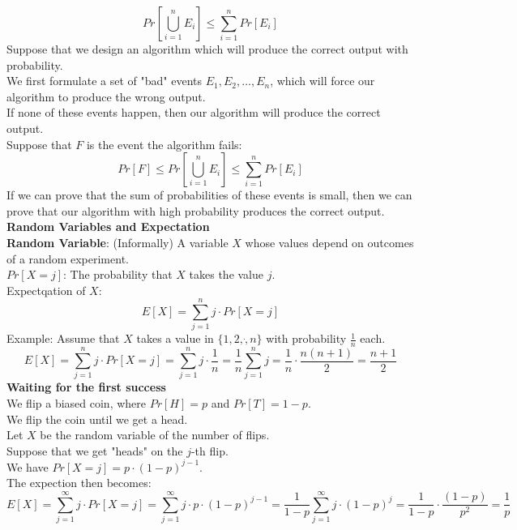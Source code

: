 \documentclass[onecolumn]{report}
\begin{document}
\begin{equation*}
    Pr[\bigcup^n_{i=1} E_i] \leq \sum^n_{i=1} Pr[E_i]
\end{equation*}
Suppose that we design an algorithm which will produce the correct output with probability.\\
We first formulate a set of "bad" events $E_1, E_2, \dots, E_n$, which will force our algorithm to produce the wrong output.\\
If none of these events happen, then our algorithm will produce the correct output.\\
Suppose that $F$ is the event the algorithm fails:
\begin{equation*}
    Pr[F] \leq Pr[\bigcup^n_{i=1} E_i] \leq \sum^n_{i=1} Pr[E_i]
\end{equation*}
If we can prove that the sum of probabilities of these events is small, then we can prove that our algorithm with high probability produces the correct output.\\
\textbf{Random Variables and Expectation}\\
\textbf{Random Variable}: (Informally) A variable $X$ whose values depend on outcomes of a random experiment.\\
$Pr[X=j]$: The probability that $X$ takes the value $j$.\\
Expectqation of $X$:
\begin{equation*}
    E[X]=\sum_{j=1}^n j \cdot Pr[X=j]
\end{equation*}
Example: Assume that $X$ takes a value in $\{1,2,\dot,n\}$ with probability $\frac{1}{n}$ each.\\
\begin{equation*}
    E[X]=\sum_{j=1}^n j \cdot Pr[X=j]=\sum_{j=1}^n j \cdot \frac{1}{n}=\frac{1}{n} \sum_{j=1}^n j=\frac{1}{n} \cdot \frac{n(n+1)}{2}=\frac{n+1}{2}
\end{equation*}
\textbf{Waiting for the first success}\\
We flip a biased coin, where $Pr[H]=p$ and $Pr[T]=1-p$.\\
We flip the coin until we get a head.\\
Let $X$ be the random variable of the number of flips.\\
Suppose that we get "heads" on the $j$-th flip.\\
We have $Pr[X=j]=p \cdot (1-p)^{j-1}$.\\
The expection then becomes:
\begin{equation*}
    E[X]=\sum_{j=1}^{\infty} j \cdot Pr[X=j]=\sum_{j=1}^{\infty} j \cdot p \cdot (1-p)^{j-1}=\frac{1}{1-p} \sum_{j=1}^{\infty} j \cdot (1-p)^j=\frac{1}{1-p} \cdot \frac{(1-p)}{p^2}=\frac{1}{p}
\end{equation*}
\end{document}
